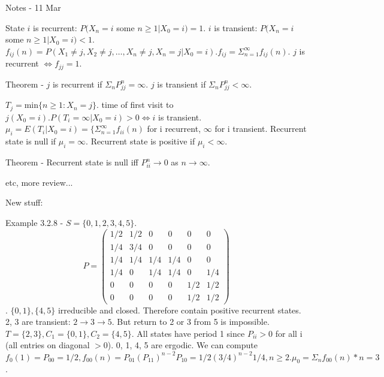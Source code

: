 \documentclass{article}
\begin{document}
Notes - 11 Mar

State $i$ is recurrent: $P(X_n=i$ some $n \ge 1|X_0=i)=1$. $i$ is transient: $P(X_n=i$ some $n \ge 1|X_0=i) < 1$. $f_{ij}(n) = P(X_1 \ne j, X_2 \ne j, \dots, X_n \ne j, X_n=j|X_0=i). f_{ij} = \Sigma_{n=1}^\infty f_{ij} (n)$. $j$ is recurrent $\iff f_{jj} = 1$.

Theorem - $j$ is recurrent if $\Sigma_n P_{jj}^n = \infty$. $j$ is transient if $\Sigma_n P_{jj}^n < \infty$.

$T_j = $min$\{n \ge 1: X_n=j\}$. time of first visit to $j (X_0=i). P(T_i = \infty | X_0=i) > 0 \iff i$ is transient. $\mu_i = E(T_i | X_0=i) = \{ \Sigma_{n=1}^\infty f_{ii}(n)$ for i recurrent, $\infty$ for i transient. Recurrent state is null if $\mu_i = \infty$. Recurrent state is positive if $\mu_i < \infty$.

Theorem - Recurrent state is null iff $P_{ii}^n \rightarrow 0$ as $n \rightarrow \infty$.

etc, more review...

New stuff:

Example 3.2.8 - $S = \{0, 1, 2, 3, 4, 5\}$. \begin{displaymath} P = \left( \begin{array}{cccccc} 1/2 & 1/2 & 0 & 0 & 0 & 0 \\ 1/4 & 3/4 & 0 & 0 & 0 & 0 \\ 1/4 & 1/4 & 1/4 & 1/4 & 0 & 0 \\ 1/4 & 0 & 1/4 & 1/4 & 0 & 1/4 \\ 0 & 0 & 0 & 0 & 1/2 & 1/2 \\ 0 & 0 & 0 & 0 & 1/2 & 1/2 \end{array} \right) \end{displaymath}. $\{0, 1\}, \{4, 5\}$ irreducible and closed. Therefore contain positive recurrent states. 2, 3 are transient: $2 \rightarrow 3 \rightarrow 5$. But return to 2 or 3 from 5 is impossible. $T = \{2, 3\}, C_1 = \{0, 1\}, C_2 = \{4, 5\}$. All states have period 1 since $P_{ii} > 0$ for all i (all entries on diagonal $> 0$). 0, 1, 4, 5 are ergodic. We can compute $f_0(1) = P_{00} = 1/2, f_{00}(n) = P_{01} (P_{11})^{n-2} P_{10} = 1/2 (3/4)^{n-2} 1/4, n \ge 2. \mu_0 = \Sigma_n f_{00}(n) * n = 3$.
\end{document}
